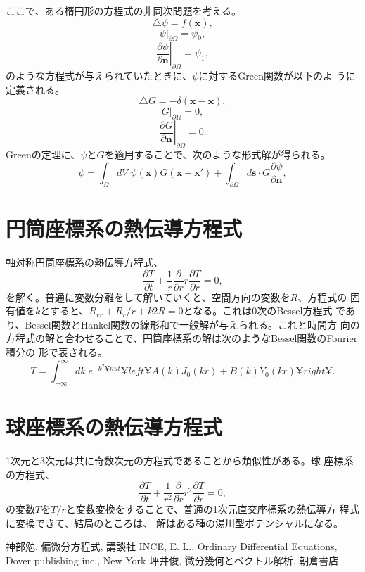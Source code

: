 ここで、ある楕円形の方程式の非同次問題を考える。
\begin{equation}
 \triangle \psi = f(\bm{x}),
\end{equation}
\begin{equation}
 \psi|_{\partial\Omega} = \psi_0,
\end{equation}
\begin{equation}
 \left.\frac{\partial \psi}{\partial \bm{n}}\right|_{\partial \Omega} = \psi_1,
\end{equation}
のような方程式が与えられていたときに、$\psi$に対するGreen関数が以下のよ
うに定義される。
\begin{equation}
 \triangle G = -\delta (\bm{x}-\bm{x}),
\end{equation}
\begin{equation}
 G|_{\partial\Omega} = 0,
\end{equation}
\begin{equation}
 \left.\frac{\partial G}{\partial \bm{n}}\right|_{\partial \Omega} = 0.
\end{equation}
Greenの定理に、$\psi$と$G$を適用することで、次のような形式解が得られる。
\begin{equation}
 \psi = \int_{\Omega}dV\mspace{5mu}
  \psi(\bm{x})G(\bm{x}-\bm{x}') 
  + \int_{\partial \Omega}d\bm{s}\cdot
  G\frac{\partial \psi}{\partial \bm{n}},
\end{equation}

\section{円筒座標系の熱伝導方程式}
軸対称円筒座標系の熱伝導方程式、
\begin{equation}
 \frac{\partial T}{\partial t}
  + \frac{1}{r}\frac{\partial}{\partial r}
  r\frac{\partial T}{\partial r}
  = 0,
\end{equation}
を解く。普通に変数分離をして解いていくと、空間方向の変数を$R$、方程式の
固有値を$k$とすると、$R_{rr}+R_r/r+k2R=0$となる。これは0次のBessel方程式
であり、Bessel関数とHankel関数の線形和で一般解が与えられる。これと時間方
向の方程式の解と合わせることで、円筒座標系の解は次のようなBessel関数のFourier積分の
形で表される。
\begin{equation}
 T = \int_{-\infty}^{\infty}dk\mspace{5mu}
  e^{-k^2¥nu t}
  ¥left¥{A(k)J_0(kr) + B(k)Y_0(kr)¥right¥}.
\end{equation}


\section{球座標系の熱伝導方程式}
1次元と3次元は共に奇数次元の方程式であることから類似性がある。球
座標系の方程式、
\begin{equation}
 \frac{\partial T}{\partial t}
  + \frac{1}{r^2}\frac{\partial}{\partial r}r^2
  \frac{\partial T}{\partial r}
  = 0,
\end{equation}
の変数$T$を$T/r$と変数変換をすることで、普通の1次元直交座標系の熱伝導方
程式に変換できて、結局のところは、 解はある種の湯川型ポテンシャルになる。


\begin{thebibliography}{10}
  神部勉, 偏微分方程式, 講談社
  INCE, E. L., Ordinary Differential Equations, Dover
	 publishing inc., New York
  坪井俊, 微分幾何とベクトル解析, 朝倉書店
\end{thebibliography}
